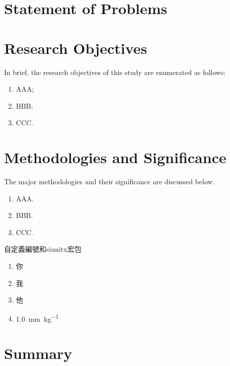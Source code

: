 \section{Statement of Problems}
\label{ch1:sec:StatementofProblems}

\section{Research Objectives}
\label{ch1:sec:ResearchObjectives}

In brief, the research objectives of this study are enumerated as follows:
\begin{enumerate}
    \item AAA;
    
    \item BBB;
    
    \item CCC.
\end{enumerate}

\section{Methodologies and Significance}
\label{ch1:sec:MethodologiesandSignificance}

The major methodologies and their significance are discussed below.
\begin{enumerate}
    \item AAA.

    \item BBB.

    \item CCC.
\end{enumerate}

自定義編號和siunitx宏包

\begin{enumerate}[label=\fbox{\arabic*}]
    \item 你
    \item 我
    \item 他
    \item \SI{1.0}{\milli\meter\per\kilo\gram}
\end{enumerate}

\section{Summary}
\label{ch1:sec:Summary}

